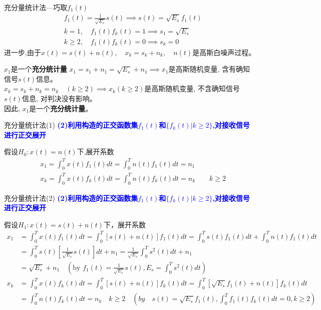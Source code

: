 \begin{frame}[shrink]{充分量统计法---巧取$f_1(t)$}
\begin{align*}
&f_1(t)=\frac{1}{\sqrt{E_s}}s(t)\implies s(t)=\sqrt{E_s}f_1(t)\\
&k=1,\quad f_1(t)f_k(t)=1\implies s_1=\sqrt{E_s}\\
&k\ge 2,\quad f_1(t)f_k(t)=0\implies s_k=0
\end{align*}
进一步,由于$x(t)=s(t)+n(t),\quad x_k=s_k+n_k,\quad n(t)$是高斯白噪声过程。
\begin{block}{$x_1$是一个\textbf{充分统计量}}
	$x_1=s_1+n_1=\sqrt{E_s}+n_1\implies x_1$是高斯随机变量, 含有确知信号$s(t)$信息。\\
	$x_k=s_k+n_k=n_k\quad(k\ge 2)\implies x_k(k\ge 2)$是高斯随机变量,  不含确知信号$s(t)$信息, 对判决没有影响。\\
	因此, $x_1$是一个\textbf{充分统计量}。
\end{block}
\end{frame}

\begin{frame}[shrink]{充分量统计法(1)}
\textbf{\textcolor{blue}{(2)利用构造的正交函数集$f_1(t)$和$\{f_k(t)|k\ge 2\}$,对接收信号进行正交展开}}
\begin{block}{假设$H_0:x(t)=n(t)$下,展开系数}
\begin{align*}	
&x_1=\int_{0}^{T}x(t)f_1(t)dt=\int_{0}^{T}n(t)f_1(t)dt=n_1\\
&x_k=\int_{0}^{T}x(t)f_k(t)dt=\int_{0}^{T}n(t)f_k(t)dt=n_k\qquad k\ge 2
\end{align*}
\end{block}
\end{frame}

\begin{frame}[shrink]{充分量统计法(2)}
\textbf{\textcolor{blue}{(2)利用构造的正交函数集$f_1(t)$和$\{f_k(t)|k\ge 2\}$,对接收信号进行正交展开}}
\begin{block}{假设$H_1:x(t)=s(t)+n(t)$下，展开系数}
\begin{align*}
	x_1&=\int_{0}^{T}x(t)f_1(t)dt=\int_{0}^{T}[s(t)+n(t)]f_1(t)dt=\int_{0}^{T}s(t)f_1(t)dt+\int_{0}^{T}n(t)f_1(t)dt\\
	&=\int_{0}^{T}s(t)[\frac{1}{\sqrt{E_s}}s(t)]dt+n_1=\frac{1}{\sqrt{E_s}}\int_{0}^{T}s^2(t)dt+n_1\\
	&=\sqrt{E_s}+n_1\quad (\text{by }f_1(t)=\frac{1}{\sqrt{E_s}}s(t),E_s=\int_{0}^{T}s^2(t)dt)\\
	x_k&=\int_{0}^{T}x(t)f_k(t)dt=\int_{0}^{T}[s(t)+n(t)]f_k(t)dt=\int_{0}^{T}[\sqrt{E_s}f_1(t)+n(t)]f_k(t)dt\\
	&=\int_{0}^{T}n(t)f_k(t)dt=n_k\quad k\ge 2\quad (by\quad s(t)=\sqrt{E_s}f_1(t), \int_{0}^{T}f_1(t)f_k(t)dt=0,k\ge 2)
\end{align*}
\end{block}
\end{frame}

